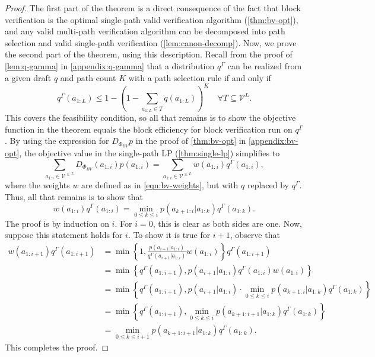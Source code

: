 \documentclass{article}
\theoremstyle{plain}
\theoremstyle{definition}
\theoremstyle{remark}
\newcommand{\V}{\mathcal{V}}
\begin{document}
\begin{proof}
    The first part of the theorem is a direct consequence of the fact that block verification is the optimal single-path valid verification algorithm (\cref{thm:bv-opt}), and any valid multi-path verification algorithm can be decomposed into path selection and valid single-path verification (\cref{lem:canon-decomp}). Now, we prove the second part of the theorem, using this description. Recall from the proof of \cref{lem:q-gamma} in \cref{appendix:q-gamma} that a distribution $q^\Gamma$ can be realized from a given draft $q$ and path count $K$ with a path selection rule if and only if
    \begin{equation}
    q^\Gamma(a_{1:L}) \leq 1-\left(1-\sum_{a_{1:L} \in T} q(a_{1:L})\right)^K \quad \forall T \subseteq \V^L.
    \end{equation}
    This covers the feasibility condition, so all that remains is to show the objective function in the theorem equals the block efficiency for block verification run on $q^\Gamma$. By using the expression for $D_{\Phi_{BV}}p$ in the proof of \cref{thm:bv-opt} in \cref{appendix:bv-opt}, the objective value in the single-path LP (\cref{thm:single-lp}) simplifies to
    \begin{equation}
        \sum_{a_{1:i} \in \V^{\leq L}} D_{\Phi_{BV}}(a_{1:i})p(a_{1:i}) = \sum_{a_{1:i} \in \V^{\leq L}} w(a_{1:i})q^\Gamma(a_{1:i}),
    \end{equation}
    where the weights $w$ are defined as in \cref{eqn:bv-weights}, but with $q$ replaced by $q^\Gamma$. Thus, all that remains is to show that
    \begin{equation}
        w(a_{1:i})q^\Gamma(a_{1:i}) = \min_{0 \leq k \leq i} p(a_{k+1:i}|a_{1:k})q^\Gamma(a_{1:k}).
    \end{equation}
    The proof is by induction on $i$. For $i=0$, this is clear as both sides are one. Now, suppose this statement holds for $i$. To show it is true for $i+1$, observe that
    \begin{align}
        w(a_{1:i+1})q^\Gamma(a_{1:i+1}) &= \min\left\{1,\frac{p(a_{i+1}|a_{1:i})}{q^\Gamma(a_{i+1}|a_{1:i})} w(a_{1:i})\right\}q^\Gamma(a_{1:i+1}) \\
        &= \min\left\{q^\Gamma(a_{1:i+1}),p(a_{i+1}|a_{1:i})q^\Gamma(a_{1:i}) w(a_{1:i})\right\} \\
        &= \min\left\{q^\Gamma(a_{1:i+1}),p(a_{i+1}|a_{1:i}) \cdot \min_{0 \leq k \leq i} p(a_{k+1:i}|a_{1:k})q^\Gamma(a_{1:k})\right\} \\
        &= \min\left\{q^\Gamma(a_{1:i+1}),\min_{0 \leq k \leq i} p(a_{k+1:i+1}|a_{1:k})q^\Gamma(a_{1:k})\right\} \\
        &= \min_{0 \leq k \leq i+1} p(a_{k+1:i+1}|a_{1:k})q^\Gamma(a_{1:k}).
    \end{align}
    This completes the proof.
\end{proof}
\end{document}
